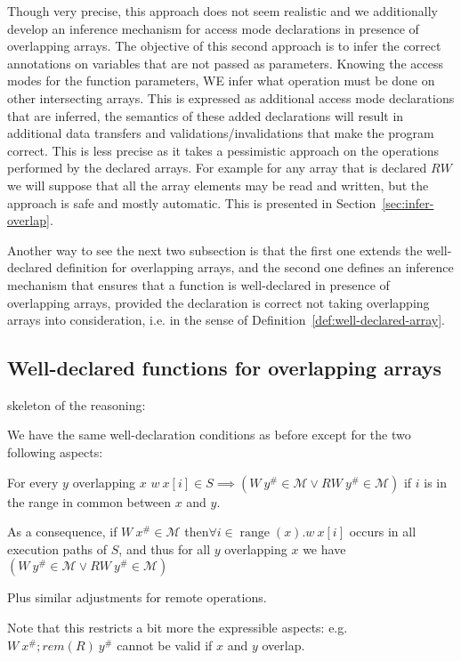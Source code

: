 \documentclass[preprint,12pt]{elsarticle}
\newcommand{\symb}[1]{\textit{#1}}
\newcommand{\rem}[1]{\symb{rem}(#1)}
\newcommand{\abs}[1]{#1^\#}
\newcommand{\AM}{\mathcal{M}}
\DeclareMathOperator{\range}{range}
\begin{document}
Though very precise, this approach does not seem realistic and we additionally develop an inference mechanism for access mode declarations in presence of overlapping arrays.
The objective of this second approach is to infer the correct annotations on  variables that are not passed as parameters. Knowing the access modes for the function parameters, WE infer what operation must be done on other intersecting arrays. This is expressed as additional access mode declarations that are inferred, the semantics of these added declarations will result in additional data transfers and validations/invalidations that make the program correct. This is less precise as it takes a pessimistic approach on the operations performed by the declared arrays. For example for any array that is declared $RW$ we will suppose that all the array elements may be read and written, but the approach is safe and mostly automatic. This is presented in Section~\ref{sec:infer-overlap}. 

Another way to see the next two subsection is that the first one extends the well-declared definition for overlapping arrays, and the second one defines an inference mechanism that ensures that a function is well-declared in presence of overlapping arrays, provided the declaration is correct not taking overlapping arrays into consideration, i.e. in the sense of Definition~\ref{def:well-declared-array}.

\subsection{Well-declared functions for overlapping arrays}\label{sec:Well-declared-overlap}
skeleton of the reasoning:

We have the same well-declaration conditions as before except for the two following aspects:

For every $y$ overlapping $x$
 $w\ x[i]\in S \implies (W\ \abs y \in \AM \lor RW\ \abs y \in \AM)$ if $i$ is in the range in common between $x$ and $y$.

As a consequence, if
$W\ \abs x\in \AM$ then$ \forall i\in\range(x). w\ x[i]$ occurs in all execution 
paths of $S$, and thus for all $y$ overlapping $x$  we have $(W\ \abs y \in \AM \lor RW\ \abs y \in \AM)$

Plus similar adjustments for remote operations.

Note that this restricts a bit more the expressible aspects: e.g. $W\ \abs x ; \rem{R}\ \abs y$ cannot be valid if $x$ and $y$ overlap.
\end{document}
